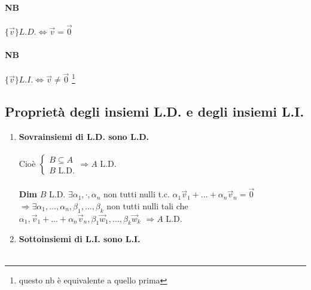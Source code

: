 {\color{red}
    \paragraph{NB}$\{\vec{v}\}L.D. \Longleftrightarrow\vec{v}=\vec{0}$
    \paragraph{NB}$\{\vec{v}\}L.I. \Longleftrightarrow\vec{v}\neq\vec{0}$
    \footnote{questo nb è equivalente a quello prima}
}
\subsection{Proprietà degli insiemi L.D. e degli insiemi L.I.}
\begin{enumerate}
    \item \textbf{Sovrainsiemi di L.D. sono L.D.}\\\\

        Cioè 
        $ 
        \begin{cases}
            B \subseteq A\\
            B\textrm{ L.D.}
        \end{cases}
        \Longrightarrow A \textrm{ L.D.}
        $\\\\
        
        \textbf{Dim} $B$ L.D. $\exists \alpha_1,\cdot, \alpha_n$ non tutti nulli t.c.
        $\alpha_1\vec{v}_1+\dots+\alpha_n\vec{v}_n=\vec{0}$ \\
        $\Longrightarrow \exists\alpha_1,\dots, \alpha_n,\beta_1,\dots,\beta_k$ 
        non tutti nulli tali che \\
        $\alpha_1, \vec{v}_1+\dots+\alpha_n\vec{v}_n,\beta_1\vec{w}_1,\dots,\beta_k\vec{w}_k$
        $\Longrightarrow A$ L.D.
    \item \textbf{Sottoinsiemi di L.I. sono L.I.}\\\\
        

\end{enumerate}
